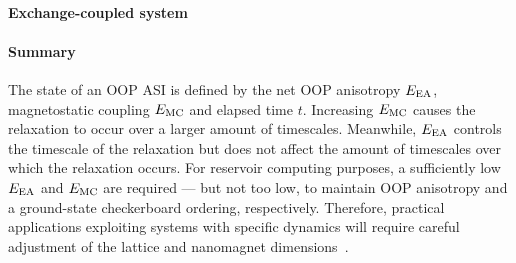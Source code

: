 \paragraph{Exchange-coupled system} %

\paragraph{Summary}
The state of an OOP ASI is defined by the net OOP anisotropy $E_\mathrm{EA}$, magnetostatic coupling $E_\mathrm{MC}$ and elapsed time $t$.
Increasing $E_\mathrm{MC}$ causes the relaxation to occur over a larger amount of timescales.
Meanwhile, $E_\mathrm{EA}$ controls the timescale of the relaxation but does not affect the amount of timescales over which the relaxation occurs.
For reservoir computing purposes, a sufficiently low $E_\mathrm{EA}$ and $E_\mathrm{MC}$ are required --- but not too low, to maintain OOP anisotropy and a ground-state checkerboard ordering, respectively.
Therefore, practical applications exploiting systems with specific dynamics will require careful adjustment of the lattice and nanomagnet dimensions~\cite{KUR-24}.

